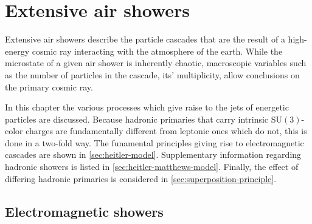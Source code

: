 
\chapter{Extensive air showers}
\label{chap:extensive-air-showers}

Extensive air showers describe the particle cascades that are the result of a high-energy cosmic ray interacting with the atmosphere of the earth. While the 
microstate of a given air shower is inherently chaotic, macroscopic variables such as the number of particles in the cascade, its' multiplicity, allow conclusions
on the primary cosmic ray.

In this chapter the various processes which give raise to the jets of energetic particles are discussed. Because hadronic primaries that carry intrinsic 
SU$(3)$-color charges are fundamentally different from leptonic ones which do not, this is done in a two-fold way. The funamental principles giving rise to 
electromagnetic cascades are shown in \autoref{sec:heitler-model}. Supplementary information regarding hadronic showers is listed in 
\autoref{sec:heitler-matthews-model}. Finally, the effect of differing hadronic primaries is considered in \autoref{sec:superposition-principle}.

\section{Electromagnetic showers}
\label{sec:heitler-model}

